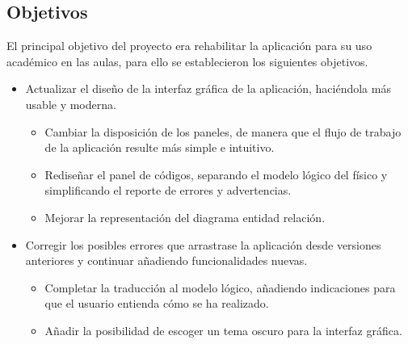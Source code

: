 \subsection{Objetivos}
El principal objetivo del proyecto era rehabilitar la aplicación para su uso académico en las aulas, para ello se establecieron los siguientes objetivos.
\begin{itemize}
    \item Actualizar el diseño de la interfaz gráfica de la aplicación, haciéndola más usable y moderna.
    \begin{itemize}
        \item Cambiar la disposición de los paneles, de manera que el flujo de trabajo de la aplicación resulte más simple e intuitivo.
        \item Rediseñar el panel de códigos, separando el modelo lógico del físico y simplificando el reporte de errores y advertencias.
        \item Mejorar la representación del diagrama entidad relación.
    \end{itemize}
    \item Corregir los posibles errores que arrastrase la aplicación desde versiones anteriores y continuar añadiendo funcionalidades nuevas.
    \begin{itemize}
        \item Completar la traducción al modelo lógico, añadiendo indicaciones para que el usuario entienda cómo se ha realizado.
        \item Añadir la posibilidad de escoger un tema oscuro para la interfaz gráfica.
    \end{itemize}
\end{itemize}
